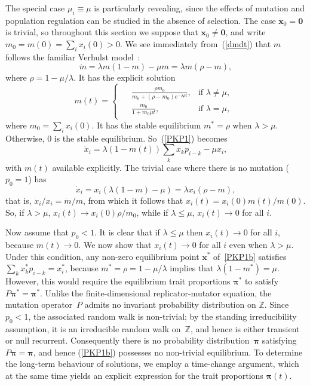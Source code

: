 \documentclass[12pt]{article}
\newcommand{\ds}{\displaystyle}
\newcommand{\Z}{\ensuremath{\mathbb Z}}
\newcommand{\bpi}{\boldsymbol{\pi}}
\newcommand{\bzero}{\boldsymbol{0}}
\newcommand{\bx}{\boldsymbol{x}}
\begin{document}
The special case $\mu_i\equiv\mu$ is particularly revealing, since the
effects of mutation and population regulation can be studied in the
absence of selection. The case $\bx_0=\bzero$ is trivial, so throughout
this section we suppose that $\bx_0\neq\bzero$, and write
$m_0=m(0)=\sum_i x_i(0)>0$.
We see immediately from~(\ref{dmdt}) that $m$
follows the familiar Verhulst model~\cite{Ver1838}:
$$
\dot m = \lambda m(1-m)-\mu m
= \lambda m \left(\rho -m \right),
$$
where $\rho=1-\mu/\lambda$.
It has the explicit solution
$$
m(t)=
\begin{cases}
\begin{aligned}
&{\ds \frac{\rho m_0}{m_0 + (\rho-m_0)e^{-\lambda\rho t}},}
&\text{if } \lambda\neq \mu,\\[1ex]
&{\ds \frac{m_0}{1+m_0 \mu t},}
&\text{if } \lambda=\mu,
\end{aligned}
\end{cases}
$$
where $m_0=\sum_i x_i(0)$.
It has the stable equilibrium $m^*=\rho$ when $\lambda>\mu$. Otherwise,
$0$ is the stable equilibrium. 
So~(\ref{PKP1}) becomes
\begin{equation}
\dot x_i
= 
\lambda (1-m(t))\sum_{k} x_k p_{i-k} -\mu x_i,
\label{PKP1b}
\end{equation}
with $m(t)$ available explicitly.
The trivial case where there is no mutation ($p_0=1$) has
$$
\dot x_i
= x_i \left(\lambda (1-m)-\mu \right)
= \lambda x_i \left(\rho-m\right),
$$
that is, $\dot x_i/x_i = \dot m/m$, from which it follows that 
$x_i(t)=x_i(0)m(t)/m(0)$.
So, if $\lambda> \mu$, $x_i(t)\to x_i(0)\rho/m_0$,
while if $\lambda\leq \mu$, $x_i(t)\to 0$ for all $i$.

Now assume that $p_0<1$. It is clear that if $\lambda\leq\mu$ then
$x_i(t)\to 0$ for all $i$, because $m(t)\to 0$. 
We now show that $x_i(t)\to 0$ for all $i$ even when $\lambda>\mu$. 
Under this condition, any non-zero equilibrium point $\bx^*$
of~\eqref{PKP1b} satisfies $\sum_{k} x_k^* p_{i-k}=x_i^*$, because
$m^*=\rho=1-\mu/\lambda$ implies that $\lambda(1-m^*)=\mu$. However,
this would require the equilibrium trait proportions $\bpi^*$ to satisfy
$P\bpi^*=\bpi^*$.
Unlike the finite-dimensional
replicator-mutator equation, the mutation operator~$P$ admits no
invariant probability distribution on $\Z$. 
Since $p_0<1$, the associated random walk is non-trivial; by the
standing irreducibility assumption, it is an irreducible random walk 
on~$\Z$, and hence is either transient or null recurrent.
Consequently there is no probability distribution~$\bpi$
satisfying $P\bpi=\bpi$, and hence (\ref{PKP1b}) possesses no
non-trivial equilibrium. To determine the long-term behaviour of
solutions, we employ a time-change argument, which at the same time
yields an explicit expression for the trait proportions $\bpi(t)$.
\end{document}
